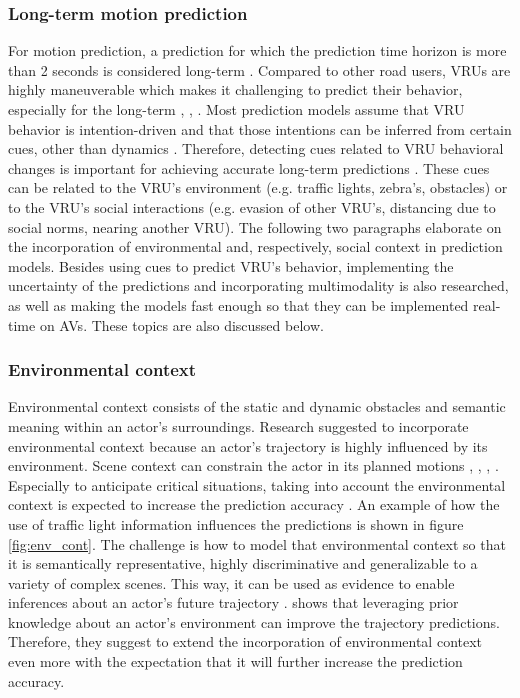 \subsubsection{Long-term motion prediction}
For motion prediction, a prediction for which the prediction time horizon is more than 2 seconds is considered long-term \cite{hormann2020long}. Compared to other road users, \glspl{VRU} are highly maneuverable which makes it challenging to predict their behavior, especially for the long-term \cite{xiong2019recurrent}, \cite{rehder2018pedestrian}, \cite{rehder2018pedestrian}. Most prediction models assume that \gls{VRU} behavior is intention-driven and that those intentions can be inferred from certain cues, other than dynamics \cite{rehder2018pedestrian}. Therefore, detecting cues related to \gls{VRU} behavioral changes is important for achieving accurate long-term predictions \cite{pool2017using}. These cues can be related to the \gls{VRU}'s environment (e.g. traffic lights, zebra's, obstacles) or to the \gls{VRU}'s social interactions (e.g. evasion of other \gls{VRU}'s, distancing due to social norms, nearing another \gls{VRU}). The following two paragraphs elaborate on the incorporation of environmental and, respectively, social context in prediction models. Besides using cues to predict \gls{VRU}'s behavior, implementing the uncertainty of the predictions and incorporating multimodality is also researched, as well as making the models fast enough so that they can be implemented real-time on \glspl{AV}. These topics are also discussed below. 

\subsubsection{Environmental context}
Environmental context consists of the static and dynamic obstacles and semantic meaning within an actor's surroundings. Research suggested to incorporate environmental context because an actor's trajectory is highly influenced by its environment. Scene context can constrain the actor in its planned motions \cite{chou2020predicting}, \cite{pfeiffer2018data}, \cite{sadeghian2019sophie}, \cite{manh2018scene}. Especially to anticipate critical situations, taking into account the environmental context is expected to increase the prediction accuracy \cite{uah2020d4}. An example of how the use of traffic light information influences the predictions is shown in figure \ref{fig:env_cont}. The challenge is how to model that environmental context so that it is semantically representative, highly discriminative and generalizable to a variety of complex scenes. This way, it can be used as evidence to enable inferences about an actor's future trajectory \cite{varshneya2017human}. \cite{pool2017using} shows that leveraging prior knowledge about an actor's environment can improve the trajectory predictions. Therefore, they suggest to extend the incorporation of environmental context even more with the expectation that it will further increase the prediction accuracy.  


